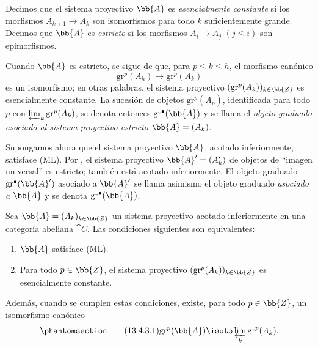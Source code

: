 \documentclass[oneside]{amsart}
\renewcommand{\leq}{\leqslant}
\let\EGAOriginalLabel\label
\renewcommand{\label}[1]{\phantomsection\EGAOriginalLabel{#1}}
\begin{document}
\begin{env}[13.4.2]
\label{0.13.4.2}
Decimos que el sistema proyectivo $\bb{A}$ es
\emph{esencialmente constante} si los morfismos
$A_{k+1}\longrightarrow A_k$ son isomorfismos para todo $k$
suficientemente grande.
Decimos que $\bb{A}$ es \emph{estricto} si los morfismos
$A_i\longrightarrow A_j$ $(j\leq i)$ son epimorfismos.

Cuando $\bb{A}$ es estricto, se sigue de  que, para
$p\leq k\leq h$, el morfismo canónico
\[
  \mathrm{gr}^p(A_h)\longrightarrow\mathrm{gr}^p(A_k)
\]
es un isomorfismo; en otras palabras, el sistema proyectivo
$(\mathrm{gr}^p(A_k))_{k\in\bb{Z}}$ es esencialmente constante.
La sucesión de objetos $\mathrm{gr}^p(A_p)$, identificada para todo
$p$ con $\varprojlim_k\mathrm{gr}^p(A_k)$, se denota entonces
$\mathrm{gr}^\bullet(\bb{A})$ y se llama el
\emph{objeto graduado asociado al sistema proyectivo estricto}
$\bb{A}=(A_k)$.

Supongamos ahora que el sistema proyectivo $\bb{A}$, acotado
inferiormente, satisface (ML).
Por , el sistema proyectivo
$\bb{A}'=(A'_k)$ de objetos de ``imagen universal'' es estricto; también está
acotado inferiormente.
El objeto graduado $\mathrm{gr}^\bullet(\bb{A}')$ asociado a
$\bb{A}'$ se llama asimismo el objeto graduado
\emph{asociado a} $\bb{A}$ y se denota
$\mathrm{gr}^\bullet(\bb{A})$.
\end{env}

\begin{proposition}[13.4.3]
\label{0.13.4.3}
Sea $\bb{A}=(A_k)_{k\in\bb{Z}}$ un sistema proyectivo acotado
inferiormente en una categoría abeliana $\cat{C}$.
Las condiciones siguientes son equivalentes:
\begin{enumerate}
  \item[{\rm a)}] $\bb{A}$ satisface \textup{(ML)}.
  \item[{\rm b)}] Para todo $p\in\bb{Z}$, el sistema proyectivo
  $(\mathrm{gr}^p(A_k))_{k\in\bb{Z}}$ es esencialmente constante.
\end{enumerate}
Además, cuando se cumplen estas condiciones, existe, para todo
$p\in\bb{Z}$, un isomorfismo canónico
\begin{equation}
\label{0.13.4.3.1}
\tag{13.4.3.1}
  \mathrm{gr}^p(\bb{A})
  \isoto
  \varprojlim_k\mathrm{gr}^p(A_k).
\end{equation}
\end{proposition}
\end{document}
